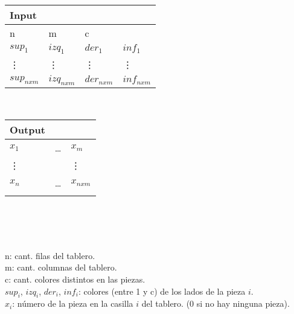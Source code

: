 \documentclass[11pt, a4paper, twoside]{article}
\begin{document}
\begin{minipage}{0.5\textwidth}
	\begin{tabular}{llll}
		Input  \\
		\hline
		n       & m       & c       &         \\
		$sup_1$ & $izq_1$ & $der_1$ & $inf_1$ \\
		\vdots & \vdots   & \vdots  & \vdots  \\
		$sup_{nxm}$ & $izq_{nxm}$ & $der_{nxm}$ & $inf_{nxm}$ \\ 
	\end{tabular} \\  
\end{minipage}
\begin{minipage}{0.5\textwidth}	
	\begin{tabular}{lll}
		Output  \\
		\hline
		$x_1$ & \dots & $x_m$ \\
		\vdots&       & \vdots \\
		$x_n$ & \dots & $x_{nxm}$ \\
		 \\
	\end{tabular} \\
\end{minipage} \\
\\
n: cant. filas del tablero. \\
m: cant. columnas del tablero. \\
c: cant. colores distintos en las piezas. \\
$sup_i$, $izq_i$, $der_i$, $inf_i$: colores (entre 1 y c) de los lados de la pieza $i$. \\
$x_i$: número de la pieza en la casilla $i$ del tablero. ($0$ si no hay ninguna pieza). \\
\\
\end{document}
